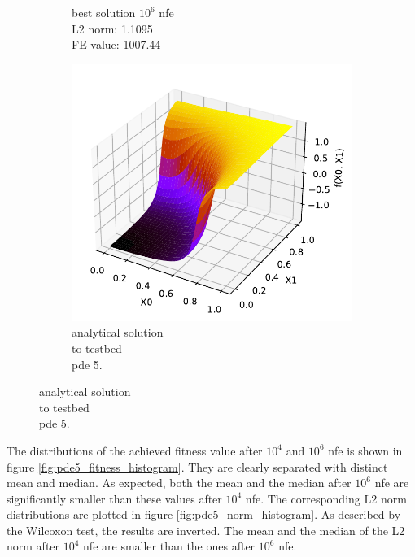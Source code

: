 \documentclass[./\jobname.tex]{subfiles}
\begin{document}
\begin{figure}[H]
\begin{subfigure}[b]{0.3333\linewidth}
		\caption{best solution $10^6$ \gls{nfe} \\ L2 norm: 1.1095 \\ FE value: 1007.44}
		\label{fig:pde5_sol_10_6}
	\end{subfigure}%
	\begin{subfigure}[b]{0.3333\linewidth}
		\centering
		\includegraphics[width=1\textwidth]{../../code/testbed/pde5/sol_pde_5.pdf}
		\caption{analytical solution \\to testbed \\ \gls{pde} 5.}
		\label{fig:pde5_analytical_solution}
	\end{subfigure}%
	\label{fig:serial_jade_pde5_sol_comparison}
\end{figure}

The distributions of the achieved fitness value after $10^4$ and $10^6$ \gls{nfe} is shown in figure \ref{fig:pde5_fitness_histogram}. They are clearly separated with distinct mean and median. As expected, both the mean and the median after $10^6$ \gls{nfe} are significantly smaller than these values after $10^4$ \gls{nfe}. The corresponding L2 norm distributions are plotted in figure \ref{fig:pde5_norm_histogram}. As described by the Wilcoxon test, the results are inverted. The mean and the median of the L2 norm after $10^4$ \gls{nfe} are smaller than the ones after $10^6$ \gls{nfe}.
\end{document}

